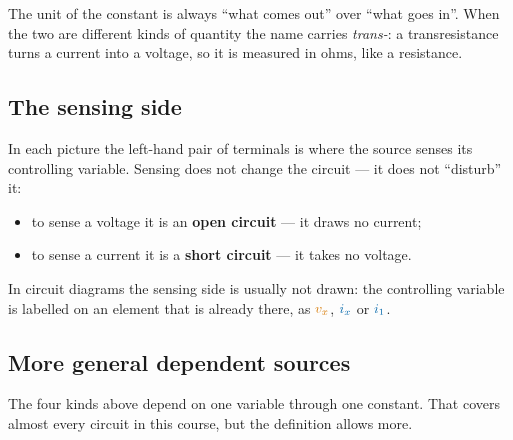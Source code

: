 \documentclass[11pt,a4paper]{article}
\newcommand{\Icol}[1]{\textcolor{ccur}{#1}}
\newcommand{\Vcol}[1]{\textcolor{cvolt}{#1}}
\begin{document}
The unit of the constant is always ``what comes out'' over ``what goes in''. When the two
are different kinds of quantity the name carries \emph{trans-}: a transresistance turns a
current into a voltage, so it is measured in ohms, like a resistance.

\subsection{The sensing side}

In each picture the left-hand pair of terminals is where the source senses its controlling
variable. Sensing does not change the circuit --- it does not ``disturb'' it:
\begin{itemize}
  \item to sense a \Vcol{voltage} it is an \textbf{open circuit} --- it draws no current;
  \item to sense a \Icol{current} it is a \textbf{short circuit} --- it takes no voltage.
\end{itemize}
In circuit diagrams the sensing side is usually not drawn: the controlling variable is
labelled on an element that is already there, as $\Vcol{v_x}$, $\Icol{i_x}$ or
$\Icol{i_1}$.

\subsection{More general dependent sources}

The four kinds above depend on one variable through one constant. That covers almost every
circuit in this course, but the definition allows more.
\end{document}
